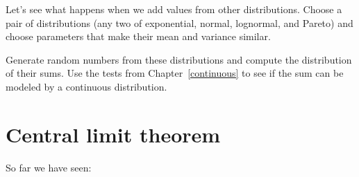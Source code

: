 \documentclass[12pt]{book}
\begin{document}
\begin{ex}

Let's see what happens when we add values from
other distributions.  Choose a pair of distributions (any two of
exponential, normal, lognormal, and Pareto) and choose parameters
that make their mean and variance similar.

Generate random numbers from these distributions and compute the
distribution of their sums.  Use the tests from
Chapter~\ref{continuous} to see if the sum can be modeled by a
continuous distribution.

\end{ex}



%
%
%
%

%
%






\section{Central limit theorem}
\label{CLT}

So far we have seen:
\end{document}
